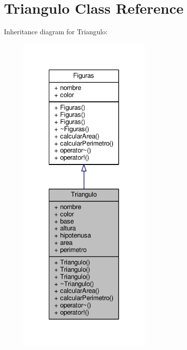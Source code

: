 \hypertarget{class_triangulo}{}\section{Triangulo Class Reference}
\label{class_triangulo}


Inheritance diagram for Triangulo\+:
\nopagebreak
\begin{figure}[H]
\begin{center}
\leavevmode
\includegraphics[width=186pt]{class_triangulo__inherit__graph}
\end{center}
\end{figure}


